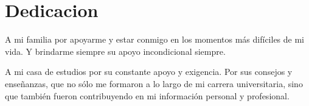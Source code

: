 \chapter*{Dedicacion}
A mi familia por apoyarme y estar conmigo en los 
momentos más difíciles de mi vida. Y brindarme siempre su apoyo incondicional 
siempre.

A mi casa de estudios por su constante apoyo y exigencia. Por sus consejos y enseñanzas, que no sólo me formaron a lo largo de mi carrera universitaria, sino que también fueron contribuyendo en mi información personal y profesional.